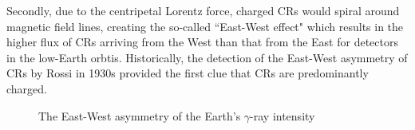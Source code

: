 Secondly,
due to the centripetal Lorentz force, charged CRs would spiral
around magnetic field lines, creating the so-called
``East-West effect" which results in the higher flux of CRs
arriving from the West than that from the East for detectors
in the low-Earth orbtis.
Historically, the detection of the East-West asymmetry of CRs
by Rossi in 1930s \citep{rossi1934} provided the first clue that
CRs are predominantly charged.


\begin{figure}[h!]
    \centering
        \hfill
        \caption{
            The East-West asymmetry of the Earth's $\gamma$-ray intensity
        }
       \label{fig:gamma_ew}
\end{figure}

